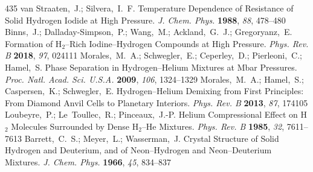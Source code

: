 \documentclass[12pt,letterpaper,oneside]{article}
\begin{document}
\begin{mcitethebibliography}{435}
\EndOfBibitem
{}
van Straaten,~J.; Silvera,~I.~F. Temperature Dependence of Resistance of Solid
  Hydrogen Iodide at High Pressure. \emph{J. Chem. Phys.} \textbf{1988},
  \emph{88}, 478--480\relax
\mciteBstWouldAddEndPuncttrue
\mciteSetBstMidEndSepPunct{\mcitedefaultmidpunct}
{\mcitedefaultendpunct}{\mcitedefaultseppunct}\relax
\EndOfBibitem
{}
Binns,~J.; Dalladay-Simpson,~P.; Wang,~M.; Ackland,~G.~J.; Gregoryanz,~E.
    Formation of H$_2$--Rich Iodine--Hydrogen Compounds at High
  Pressure. \emph{Phys. Rev. B} \textbf{2018}, \emph{97}, 024111\relax
\mciteBstWouldAddEndPuncttrue
\mciteSetBstMidEndSepPunct{\mcitedefaultmidpunct}
{\mcitedefaultendpunct}{\mcitedefaultseppunct}\relax
\EndOfBibitem
{}
Morales,~M.~A.; Schwegler,~E.; Ceperley,~D.; Pierleoni,~C.; Hamel,~S.
    Phase Separation in Hydrogen--Helium Mixtures at Mbar
  Pressures. \emph{Proc. Natl. Acad. Sci. U.S.A.} \textbf{2009}, \emph{106},
  1324--1329\relax
\mciteBstWouldAddEndPuncttrue
\mciteSetBstMidEndSepPunct{\mcitedefaultmidpunct}
{\mcitedefaultendpunct}{\mcitedefaultseppunct}\relax
\EndOfBibitem
{}
Morales,~M.~A.; Hamel,~S.; Caspersen,~K.; Schwegler,~E. Hydrogen--Helium
  Demixing from First Principles: From Diamond Anvil Cells to Planetary
  Interiors. \emph{Phys. Rev. B} \textbf{2013}, \emph{87}, 174105\relax
\mciteBstWouldAddEndPuncttrue
\mciteSetBstMidEndSepPunct{\mcitedefaultmidpunct}
{\mcitedefaultendpunct}{\mcitedefaultseppunct}\relax
\EndOfBibitem
{}
Loubeyre,~P.; Le~Toullec,~R.; Pinceaux,~J.-P. Helium Compressional Effect on
  H$_2$ Molecules Surrounded by Dense H$_2$--He Mixtures. \emph{Phys. Rev. B}
  \textbf{1985}, \emph{32}, 7611--7613\relax
\mciteBstWouldAddEndPuncttrue
\mciteSetBstMidEndSepPunct{\mcitedefaultmidpunct}
{\mcitedefaultendpunct}{\mcitedefaultseppunct}\relax
\EndOfBibitem
{}
Barrett,~C.~S.; Meyer,~L.; Wasserman,~J. Crystal Structure of Solid Hydrogen
  and Deuterium, and of Neon--Hydrogen and Neon--Deuterium Mixtures. \emph{J.
  Chem. Phys.} \textbf{1966}, \emph{45}, 834--837\relax

\end{mcitethebibliography}
\end{document}

